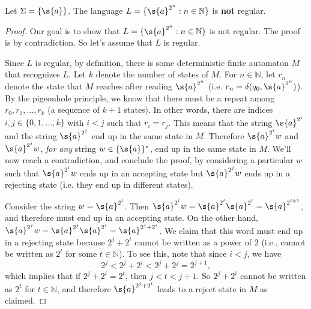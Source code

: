 \begin{flex}
\begin{theorem} \label{theorem:A-unary-non-regular-language}
Let $\Sigma = \{\s{a}\}$. The language $L = \{\s{a}^{2^n}: n \in \mathbb{N}\}$ is \textbf{not} regular.
\end{theorem}
\begin{proof}
Our goal is to show that $L = \{\s{a}^{2^n}: n \in \mathbb{N}\}$ is not regular. The proof is by contradiction. So let's assume that $L$ is regular. 

Since $L$ is regular, by definition, there is some deterministic finite automaton $M$ that recognizes $L$. Let $k$ denote the number of states of $M$. For $n \in \mathbb{N}$, let $r_n$ denote the state that $M$ reaches after reading $\s{a}^{2^n}$ (i.e. $r_n = \delta(q_0, \s{a}^{2^n})$). By the pigeonhole principle, we know that there must be a repeat among $r_0, r_1,\ldots, r_k$ (a sequence of $k+1$ states). In other words, there are indices $i, j \in \{0,1,\ldots,k\}$ with $i < j$ such that $r_i = r_j$. This means that the string $\s{a}^{2^i}$ and the string $\s{a}^{2^j}$ end up in the same state in $M$. Therefore $\s{a}^{2^i}w$ and $\s{a}^{2^j}w$, \emph{for any} string $w \in \{\s{a}\}^*$, end up in the same state in $M$. We'll now reach a contradiction, and conclude the proof, by considering a particular $w$ such that $\s{a}^{2^i}w$ ends up in an accepting state but $\s{a}^{2^j}w$ ends up in a rejecting state (i.e. they end up in different states). 

Consider the string $w = \s{a}^{2^i}$. Then $\s{a}^{2^i}w = \s{a}^{2^i}\s{a}^{2^i} = \s{a}^{2^{i+1}}$, and therefore must end up in an accepting state. On the other hand, $\s{a}^{2^j}w = \s{a}^{2^j}\s{a}^{2^i} = \s{a}^{2^j + 2^i}$. We claim that this word must end up in a rejecting state because $2^j + 2^i$ cannot be written as a power of $2$ (i.e., cannot be written as $2^t$ for some $t \in \mathbb{N}$). To see this, note that since $i < j$, we have
\[
2^j < 2^j + 2^i < 2^j + 2^j = 2^{j+1},
\]
which implies that if $2^j + 2^i = 2^t$, then $j < t < j+1$. So $2^j + 2^i$ cannot be written as $2^t$ for $t \in \mathbb{N}$, and therefore $\s{a}^{2^j + 2^i}$ leads to a reject state in $M$ as claimed.
\end{proof}
\end{flex}


